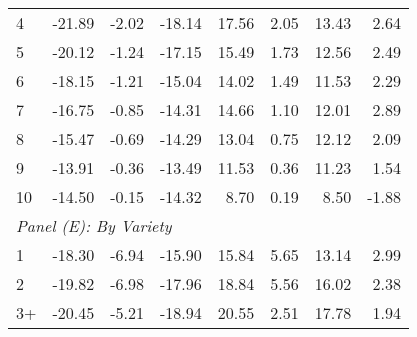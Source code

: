 \begin{table}
\begin{tabular}{lrrrrrrr}
	4       &          -21.89 &      -2.02 &         -18.14 &            17.56 &      2.05 &          13.43 &  2.64 \\
	5       &          -20.12 &      -1.24 &         -17.15 &            15.49 &      1.73 &          12.56 &  2.49 \\
	6       &          -18.15 &      -1.21 &         -15.04 &            14.02 &      1.49 &          11.53 &  2.29 \\
	7       &          -16.75 &      -0.85 &         -14.31 &            14.66 &      1.10 &          12.01 &  2.89 \\
	8       &          -15.47 &      -0.69 &         -14.29 &            13.04 &      0.75 &          12.12 &  2.09 \\
	9       &          -13.91 &      -0.36 &         -13.49 &            11.53 &      0.36 &          11.23 &  1.54 \\
	10      &          -14.50 &      -0.15 &         -14.32 &             8.70 &      0.19 &           8.50 & -1.88 \\ \hline
	\multicolumn{8}{l}{\textit{Panel (E): By Variety}}                                                              \\ \hline
	1       &          -18.30 &      -6.94 &         -15.90 &            15.84 &      5.65 &          13.14 &  2.99 \\
	2       &          -19.82 &      -6.98 &         -17.96 &            18.84 &      5.56 &          16.02 &  2.38 \\
	3+      &          -20.45 &      -5.21 &         -18.94 &            20.55 &      2.51 &          17.78 &  1.94 \\ \hline\hline
\end{tabular}
\end{table}
